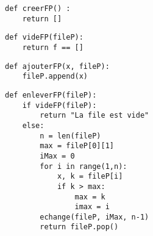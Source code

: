 \begin{Answer}
\begin{lstlisting}
def creerFP() :
    return []
\end{lstlisting}

\begin{lstlisting}
def videFP(fileP):
    return f == []
\end{lstlisting}

\begin{lstlisting}
def ajouterFP(x, fileP):
    fileP.append(x)
\end{lstlisting}

\begin{lstlisting}
def enleverFP(fileP):
    if videFP(fileP):
        return "La file est vide"
    else:
        n = len(fileP)
        max = fileP[0][1]
        iMax = 0
        for i in range(1,n):
            x, k = fileP[i]
            if k > max:
                max = k
                imax = i
        echange(fileP, iMax, n-1)
        return fileP.pop()

\end{lstlisting}
\end{Answer}
\newpage
